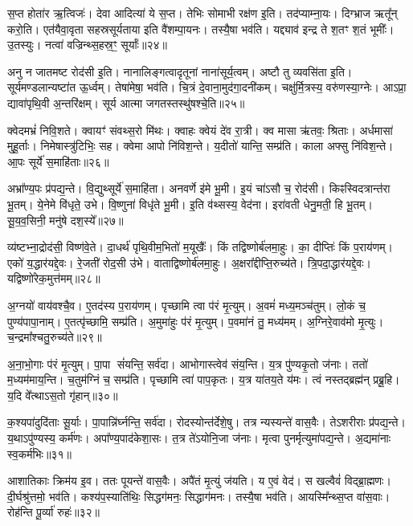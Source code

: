 स॒प्त होता॑र ऋ॒त्विजः॑। देवा आदित्या॑ ये स॒प्त। 
तेभिः सोमाभी रक्ष॑ण इ॒ति। तद॑प्याम्ना॒यः। 
दिग्भ्राज ऋतू᳚न्‌ करो॒ति। एत॑यैवा॒वृता सहस्रसूर्यताया इति वै॑शम्पा॒यनः। 
तस्यै॒षा भव॑ति। यद्द्याव॑ इन्द्र ते श॒तꣳ श॒तं भूमीः᳚। 
उ॒तस्युः। नत्वा॑ वज्रिन्थ्स॒हस्र॒ꣳ॒ सूर्याः᳚॥२४॥

अनु न जातमष्ट रोद॑सी इ॒ति। नानालिङ्गत्वादृतूनां नाना॑सूर्य॒त्वम्। 
अष्टौ तु व्यवसि॑ता इ॒ति। सूर्यमण्डलान्यष्टा॑त ऊ॒र्ध्वम्। 
तेषा॑मेषा॒ भव॑ति। चि॒त्रं दे॒वाना॒मुद॑गा॒दनी॑कम्। 
चक्षु॑र्मि॒त्रस्य॒ वरु॑णस्या॒ग्नेः। आऽप्रा॒ द्यावा॑पृथि॒वी अ॒न्तरि॑क्षम्। 
सूर्य आत्मा जगतस्तस्थु॑षश्चे॒ति॥२५॥\anuvakamend


क्वेदमभ्रं॑ निवि॒शते। क्वायꣳ॑ संवथ्स॒रो मि॑थः। 
क्वाहः क्वेयं दे॑व रा॒त्री। क्व मासा ऋ॑तवः॒ श्रिताः। 
अर्धमासा॑ मुहू॒र्ताः। निमेषास्त्रु॑टिभिः॒ सह। 
क्वेमा आपो नि॑विश॒न्ते। य॒दीतो॑ यान्ति॒ सम्प्र॑ति। 
काला अफ्सु नि॑विश॒न्ते। आ॒पः सूर्ये॑ स॒माहि॑ताः॥२६॥

अभ्रा᳚ण्य॒पः प्र॑पद्य॒न्ते। वि॒द्युथ्सूर्ये॑ स॒माहि॑ता। 
अनवर्णे इ॑मे भू॒मी। इ॒यं चा॑ऽसौ च॒ रोद॑सी। 
किꣴस्विदत्रान्त॑रा भू॒तम्। ये॒नेमे वि॑धृते॒ उभे। 
वि॒ष्णुना॑ विधृ॑ते भू॒मी। इ॒ति व॑थ्सस्य॒ वेद॑ना। 
इरा॑वती धेनु॒मती॒ हि भू॒तम्। सू॒य॒व॒सिनी॒ मनु॑षे दश॒स्ये᳚॥२७॥

व्य॑ष्टभ्ना॒द्रोद॑सी॒ विष्ण॑वे॒ते। दा॒धर्थ॑ पृथि॒वीम॒भितो॑ म॒यूखैः᳚। 
किं तद्विष्णोर्ब॑ल\-मा॒हुः। का॒ दीप्तिः॑ किं प॒राय॑णम्। 
एको॑ य॒द्धार॑यद्दे॒वः। रे॒जती॑ रोद॒सी उ॑भे। 
वाताद्विष्णोर्ब॑लमा॒हुः। अ॒क्षरा᳚द्दीप्ति॒रुच्य॑ते। 
त्रि॒पदा॒द्धार॑यद्दे॒वः। यद्विष्णो॑रेक॒मुत्त॑मम्॥२८॥

अ॒ग्नयो॑ वाय॑वश्चै॒व। ए॒तद॑स्य प॒राय॑णम्। 
पृच्छामि त्वा प॑रं मृ॒त्युम्। अ॒वमं॑ मध्य॒मञ्च॑तुम्। 
लो॒कं च॒ पुण्य॑पापा॒नाम्। ए॒तत्पृ॑च्छामि॒ सम्प्र॑ति। 
अ॒मुमा॑हुः प॑रं मृ॒त्युम्। प॒वमा॑नं तु॒ मध्य॑मम्। 
अ॒ग्निरे॒वाव॑मो मृ॒त्युः। च॒न्द्रमा᳚श्चतु॒रुच्य॑ते॥२९॥

अ॒ना॒भो॒गाः प॑रं मृ॒त्युम्। पा॒पा सं॑यन्ति॒ सर्व॑दा। 
आभोगास्त्वेव॑ संय॒न्ति। य॒त्र पु॑ण्यकृ॒तो ज॑नाः। 
ततो॑ म॒ध्यम॑माय॒न्ति। च॒तुम॑ग्निं च॒ सम्प्र॑ति। 
पृच्छामि त्वा॑ पाप॒कृतः। य॒त्र या॑तय॒ते य॑मः। 
त्वं नस्तद्ब्रह्म॑न्‌ प्रब्रू॒हि। य॒दि वे᳚त्थाऽस॒तो गृ॑हान्॥३०॥

क॒श्यपा॑दुदि॑ताः सू॒र्याः। पा॒पान्नि॑र्घ्नन्ति॒ सर्व॑दा। 
रोदस्योन्त॑र्दे\-शे॒षु। तत्र न्यस्यन्ते॑ वास॒वैः। 
तेऽशरीराः प्र॑पद्य॒न्ते। य॒था\-ऽपु॑ण्यस्य॒ कर्म॑णः। 
अपा᳚ण्य॒पाद॑केशा॒सः। त॒त्र ते॑ऽयोनि॒जा ज॑नाः। 
मृत्वा पुनर्मृत्युमा॑पद्य॒न्ते। अ॒द्यमा॑नाः स्व॒कर्म॑भिः॥३१॥

आशातिकाः क्रिम॑य इ॒व। ततः पूयन्ते॑ वास॒वैः। अपै॑तं मृ॒त्युं ज॑यति। 
य ए॒वं वेद॑। स खल्वैवं॑ विद्ब्रा॒ह्मणः। दी॒र्घश्रु॑त्तमो॒ भव॑ति। 
कश्य॑प॒स्याति॑थिः॒ सिद्धग॑मनः॒ सिद्धाग॑मनः। तस्यै॒षा भव॑ति। 
आयस्मि᳚न्थ्स॒प्त वा॑स॒वाः। रोह॑न्ति पू॒र्व्या॑ रुहः॑॥३२॥

